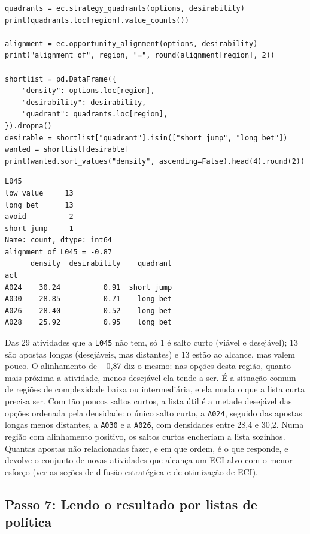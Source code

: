 \begin{lstlisting}
quadrants = ec.strategy_quadrants(options, desirability)
print(quadrants.loc[region].value_counts())

alignment = ec.opportunity_alignment(options, desirability)
print("alignment of", region, "=", round(alignment[region], 2))

shortlist = pd.DataFrame({
    "density": options.loc[region],
    "desirability": desirability,
    "quadrant": quadrants.loc[region],
}).dropna()
desirable = shortlist["quadrant"].isin(["short jump", "long bet"])
wanted = shortlist[desirable]
print(wanted.sort_values("density", ascending=False).head(4).round(2))
\end{lstlisting}
\begin{lstlisting}[language={}, numbers=none, backgroundcolor=\color{white}, frame=leftline, framerule=2pt, rulecolor=\color{noteborder}, xleftmargin=1.5em]
L045
low value     13
long bet      13
avoid          2
short jump     1
Name: count, dtype: int64
alignment of L045 = -0.87
      density  desirability    quadrant
act                                    
A024    30.24          0.91  short jump
A030    28.85          0.71    long bet
A026    28.40          0.52    long bet
A028    25.92          0.95    long bet
\end{lstlisting}

Das 29 atividades que a \texttt{L045} não tem, só
1 é salto curto (viável e desejável);
13 são apostas longas
(desejáveis, mas distantes) e
13 estão ao alcance,
mas valem pouco. O alinhamento de $-$0{,}87 diz o mesmo: nas
opções desta região, quanto mais próxima a atividade, menos desejável
ela tende a ser. É a situação comum de regiões de complexidade baixa ou
intermediária, e ela muda o que a lista curta precisa ser. Com tão
poucos saltos curtos, a lista útil é a metade desejável das opções
ordenada pela densidade: o único salto curto, a
\texttt{A024}, seguido das apostas longas menos
distantes, a \texttt{A030} e a
\texttt{A026}, com densidades entre
28{,}4 e 30{,}2. Numa
região
com alinhamento positivo, os saltos curtos encheriam a lista sozinhos.
Quantas apostas não relacionadas fazer, e em que ordem, é o que
 responde, e  devolve o
conjunto de novas atividades que alcança um ECI-alvo com o menor esforço
(ver as seções de difusão estratégica e de otimização de ECI).

\subsection{Passo 7: Lendo o resultado por listas de política}

